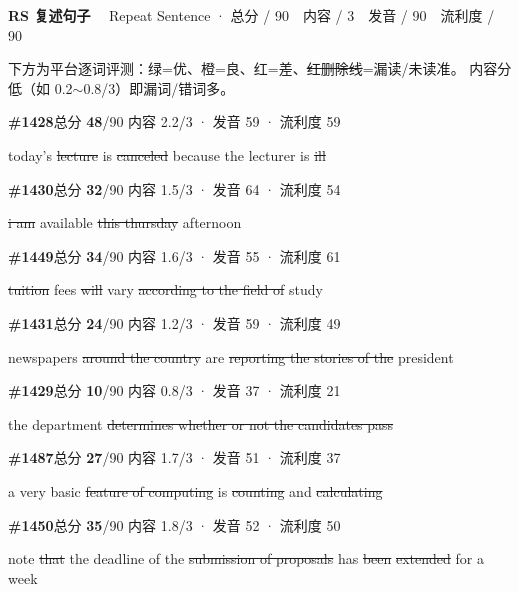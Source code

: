 \documentclass[11pt]{article}
\newcommand{\ptetask}[2]{%
  \needspace{4\baselineskip}\medskip
  \begin{tcolorbox}[enhanced, colback=cHead, colframe=cHead, sharp corners,
     left=12pt, right=12pt, top=5pt, bottom=5pt, boxrule=0pt]
    {\large\bfseries\color{white} #1}\ \ {\color{white!80} #2}
  \end{tcolorbox}\smallskip}
\newcommand{\sg}[1]{\textcolor{cSpkGood}{#1}}   %
\newcommand{\sy}[1]{\textcolor{cSpkOk}{#1}}     %
\newcommand{\sr}[1]{\textcolor{cSpkBad}{#1}}    %
\newcommand{\smiss}[1]{\textcolor{cSpkBad}{\sout{#1}}}  %
\begin{document}
\ptetask{RS 复述句子}{Repeat Sentence · 总分 / 90　内容 / 3　发音 / 90　流利度 / 90}

{\small\color{gray} 下方为平台逐词评测：{\color{cSpkGood}绿=优}、{\color{cSpkOk}橙=良}、{\color{cSpkBad}红=差}、{\color{cSpkBad}\sout{红删除线}=漏读/未读准}。
内容分低（如 0.2$\sim$0.8/3）即漏词/错词多。}\smallskip

\newcommand{\rsitem}[5]{%
  {\small\textbf{\##1}\quad 总分 \textcolor{cAccent}{\bfseries #2}/90 \quad
   {\footnotesize\color{gray}内容 #3/3 · 发音 #4 · 流利度 #5}}\par\nopagebreak\smallskip}

\rsitem{1428}{48}{2.2}{59}{59}
\begin{asrbox}\sg{today's} \smiss{lecture} \sg{is} \smiss{canceled} \sg{because the lecturer is} \smiss{ill}\end{asrbox}\smallskip

\rsitem{1430}{32}{1.5}{64}{54}
\begin{asrbox}\smiss{i am} \sg{available} \smiss{this thursday} \sg{afternoon}\end{asrbox}\smallskip

\rsitem{1449}{34}{1.6}{55}{61}
\begin{asrbox}\smiss{tuition} \sg{fees} \smiss{will} \sg{vary} \smiss{according to the field of} \sg{study}\end{asrbox}\smallskip

\rsitem{1431}{24}{1.2}{59}{49}
\begin{asrbox}\sy{newspapers} \smiss{around the country} \sg{are} \smiss{reporting the stories of the} \sg{president}\end{asrbox}\smallskip

\rsitem{1429}{10}{0.8}{37}{21}
\begin{asrbox}\sg{the} \sr{department} \smiss{determines whether or not the candidates pass}\end{asrbox}\smallskip

\rsitem{1487}{27}{1.7}{51}{37}
\begin{asrbox}\sr{a} \sg{very basic} \smiss{feature of computing} \sg{is} \smiss{counting} \sg{and} \smiss{calculating}\end{asrbox}\smallskip

\rsitem{1450}{35}{1.8}{52}{50}
\begin{asrbox}\sg{note} \smiss{that} \sg{the deadline} \sy{of} \sg{the} \smiss{submission of proposals} \sg{has} \smiss{been} \smiss{extended} \sg{for} \sr{a} \sg{week}\end{asrbox}\smallskip
\end{document}
